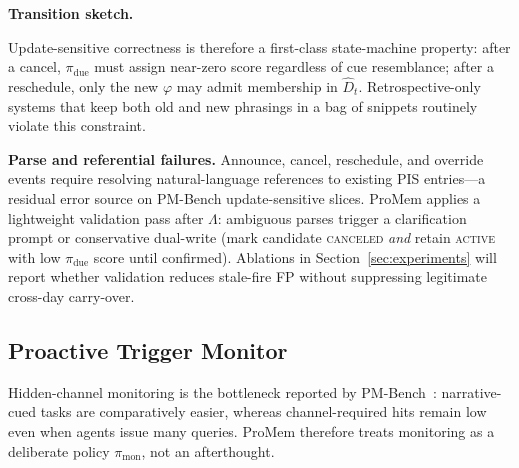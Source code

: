 \noindent\textbf{Transition sketch.}
Update-sensitive correctness is therefore a first-class state-machine property: after a cancel, $\pi_{}$ must assign near-zero score regardless of cue resemblance; after a reschedule, only the new $\varphi$ may admit membership in $_t$. Retrospective-only systems that keep both old and new phrasings in a bag of snippets routinely violate this constraint.

\noindent\textbf{Parse and referential failures.}
Announce, cancel, reschedule, and override events require resolving natural-language references to existing PIS entries---a residual error source on PM-Bench update-sensitive slices. ProMem applies a lightweight validation pass after $\Lambda$: ambiguous parses trigger a clarification prompt or conservative dual-write (mark candidate \textsc{canceled} \emph{and} retain \textsc{active} with low $\pi_{}$ score until confirmed). Ablations in Section~\ref{sec:experiments} will report whether validation reduces stale-fire FP without suppressing legitimate cross-day carry-over.

\subsection{Proactive Trigger Monitor}
\label{sec:monitor}

Hidden-channel monitoring is the bottleneck reported by PM-Bench~\cite{pmbench2026}: narrative-cued tasks are comparatively easier, whereas channel-required hits remain low even when agents issue many queries. ProMem therefore treats monitoring as a deliberate policy $\pi_{}$, not an afterthought.


